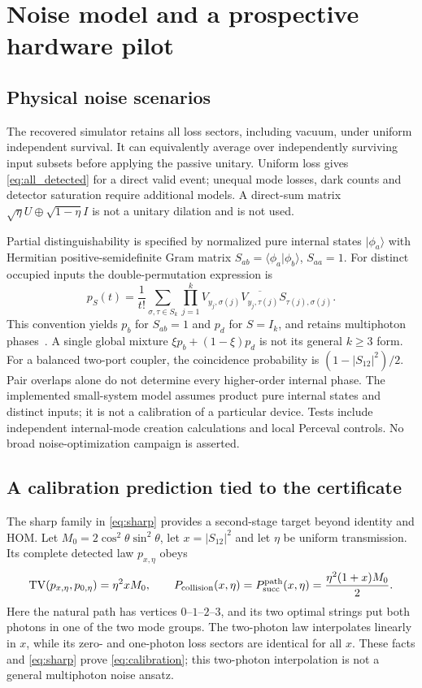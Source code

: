 \documentclass[11pt,a4paper]{article}
\theoremstyle{remark}\newtheorem{remark}[theorem]{Remark}
\DeclareMathOperator{\TV}{TV}
\newcommand{\succp}{P_{\mathrm{succ}}}
\begin{document}
\section{Noise model and a prospective hardware pilot}\label{sec:pilot}
\subsection{Physical noise scenarios}
The recovered simulator retains all loss sectors, including vacuum, under uniform independent survival. It can equivalently average over independently surviving input subsets before applying the passive unitary. Uniform loss gives \cref{eq:all_detected} for a direct valid event; unequal mode losses, dark counts and detector saturation require additional models. A direct-sum matrix $\sqrt\eta U\oplus\sqrt{1-\eta}I$ is not a unitary dilation and is not used.

Partial distinguishability is specified by normalized pure internal states $|\phi_a\rangle$ with Hermitian positive-semidefinite Gram matrix $S_{ab}=\langle\phi_a|\phi_b\rangle$, $S_{aa}=1$. For distinct occupied inputs the double-permutation expression is
\begin{equation}
 p_S(t)=\frac1{t!}\sum_{\sigma,\tau\in S_k}
 \prod_{j=1}^k V_{y_j,\sigma(j)}\overline{V_{y_j,\tau(j)}}
 S_{\tau(j),\sigma(j)}.\label{eq:partial}
\end{equation}
This convention yields $p_b$ for $S_{ab}=1$ and $p_d$ for $S=I_k$, and retains multiphoton phases~\cite{tichy2015}. A single global mixture $\xi p_b+(1-\xi)p_d$ is not its general $k\ge3$ form. For a balanced two-port coupler, the coincidence probability is $(1-|S_{12}|^2)/2$. Pair overlaps alone do not determine every higher-order internal phase. The implemented small-system model assumes product pure internal states and distinct inputs; it is not a calibration of a particular device. Tests include independent internal-mode creation calculations and local Perceval controls. No broad noise-optimization campaign is asserted.

\subsection{A calibration prediction tied to the certificate}
The sharp family in \cref{eq:sharp} provides a second-stage target beyond identity and HOM. Let $M_0=2\cos^2\theta\sin^2\theta$, let $x=|S_{12}|^2$ and let $\eta$ be uniform transmission. Its complete detected law $p_{x,\eta}$ obeys
\begin{equation}
 \TV(p_{x,\eta},p_{0,\eta})=\eta^2 xM_0,\qquad
 P_{\rm collision}(x,\eta)=\succp^{\rm path}(x,\eta)
 =\frac{\eta^2(1+x)M_0}{2}.\label{eq:calibration}
\end{equation}
Here the natural path has vertices $0$--$1$--$2$--$3$, and its two optimal strings put both photons in one of the two mode groups. The two-photon law interpolates linearly in $x$, while its zero- and one-photon loss sectors are identical for all $x$. These facts and \cref{eq:sharp} prove \cref{eq:calibration}; this two-photon interpolation is not a general multiphoton noise ansatz.
\end{document}
